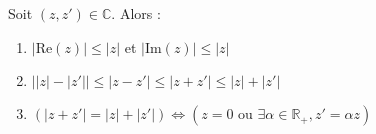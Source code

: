 \documentclass{article}
\begin{document}
\begin{adjustwidth}{-3cm}{-3cm}
Soit $(z,z') \in \mathbb{C}$. Alors :
\begin{enumerate}[label=\textbf{\arabic*.}]
\item $\left\lvert \text{Re}(z)\right\rvert \leq \left\lvert z\right\rvert$ et $\left\lvert \text{Im}(z)\right\rvert \leq \left\lvert z \right\rvert $

\item $\left\lvert \left\lvert z \right\rvert - \left\lvert z' \right\rvert  \right\rvert \leq \left\lvert z-z'\right\rvert \leq\left\lvert z+z'\right\rvert \leq \left\lvert z\right\rvert +\left\lvert z'\right\rvert $  
\item $(\left\lvert z+z'\right\rvert = \left\lvert z\right\rvert +\left\lvert z'\right\rvert) \Leftrightarrow (z = 0 \text{ ou } \exists \alpha \in \mathbb{R}_+, z' = \alpha z) $
\end{enumerate}

\end{adjustwidth}
\end{document}
